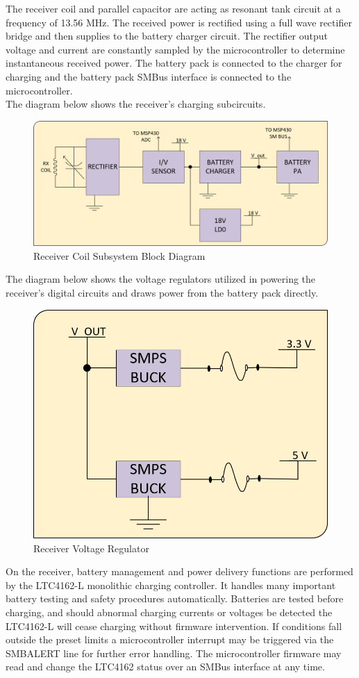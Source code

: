\documentclass[12pt]{article}
\begin{document}
\hfill

\pagebreak
\indent
The receiver coil and parallel capacitor are acting as resonant tank circuit at a frequency of 13.56 MHz. The received power is rectified using a full wave rectifier bridge and then supplies to the battery charger circuit. The rectifier output voltage and current are constantly sampled by the microcontroller to determine instantaneous received power. The battery pack is connected to the charger for charging and the battery pack SMBus interface is connected to the microcontroller. \\

\indent
The diagram below shows the receiver’s charging subcircuits.
\hfill

\begin{figure}[h!]
\centering
\includegraphics[width=0.88\linewidth]{recv_coil}
\caption{Receiver Coil Subsystem Block Diagram}
\end{figure}

\indent
The diagram below shows the voltage regulators utilized in powering the receiver’s digital circuits and draws power from the battery pack directly.
\hfill

\begin{figure}[h!]
\centering
\includegraphics[width=0.45\linewidth]{recv_sub_volt_reg}
\caption{Receiver Voltage Regulator}
\end{figure}

\hfill
\pagebreak

\indent
On the receiver, battery management and power delivery functions are performed by the LTC4162-L monolithic charging controller. It handles many important battery testing and safety procedures automatically. Batteries are tested before charging, and should abnormal charging currents or voltages be detected the LTC4162-L will cease charging without firmware intervention. If conditions fall outside the preset limits a microcontroller interrupt may be triggered via the SMBALERT line for further error handling. The microcontroller firmware may read and change the LTC4162 status over an SMBus interface at any time.\\
\end{document}
